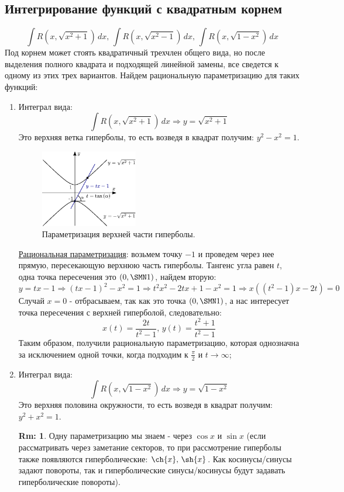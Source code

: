 \documentclass[12pt]{article}
\newcommand{\dd}{\, d}
\theoremstyle{definition}
\newtheorem{rem}{Rm:}
\DeclareMathOperator{\dint}{\displaystyle\int}
\begin{document}
\subsection*{Интегрирование функций с квадратным корнем}
$$
	\dint R(x, \sqrt{x^2 + 1}) \dd x, \, \dint R(x, \sqrt{x^2 - 1}) \dd x, \, \dint R(x, \sqrt{1 - x^2}) \dd x
$$ 
Под корнем может стоять квадратичный трехчлен общего вида, но после выделения полного квадрата и подходящей линейной замены, все сведется к одному из этих трех вариантов. Найдем рациональную параметризацию для таких функций:
\begin{enumerate}[label={(\Roman*)}]
	\item Интеграл вида: 
	$$
		\dint R(x, \sqrt{x^2 + 1}) \dd x \Rightarrow y = \sqrt{x^2 + 1}
	$$
	Это верхняя ветка гиперболы, то есть возведя в квадрат получим: $y^2 - x^2 = 1$.
	\begin{figure}[H]
		\centering
		\includegraphics[width=0.4\textwidth]{2_1.eps}
		\caption{Параметризация верхней части гиперболы.}
		\label{2_1}
	\end{figure}
	\uline{Рациональная параметризация}: возьмем точку $-1$ и проведем через нее прямую, пересекающую верхнюю часть гиперболы. Тангенс угла равен $t$, одна точка пересечения это $(0,\SMN 1)$, найдем вторую: 
	$$
		y = tx - 1 \Rightarrow (tx - 1)^2 - x^2 = 1 \Rightarrow t^2 x^2 - 2tx + 1 - x^2 = 1 \Rightarrow x((t^2 - 1)x - 2t) = 0
	$$
	Случай $x = 0$ - отбрасываем, так как это точка $(0,\SMN 1)$, а нас интересует точка пересечения с верхней гиперболой, следовательно:
	$$
		x(t) = \dfrac{2t}{t^2 - 1},\, y(t) = \dfrac{t^2 + 1}{t^2 - 1}
	$$ 
	Таким образом, получили рациональную параметризацию, которая однозначна за исключением одной точки, когда подходим к $\frac{\pi}{2}$ и $t \to \infty$;
	\item Интеграл вида: 
	$$
		\dint R(x, \sqrt{1 - x^2}) \dd x \Rightarrow y = \sqrt{1 - x^2}
	$$ 
	Это верхняя половина окружности, то есть возведя в квадрат получим: $y^2 + x^2 = 1$.
	\begin{rem}
		Одну параметризацию мы знаем - через $\cos{x}$ и $\sin{x}$ (если рассматривать через заметание секторов, то при рассмотрение гиперболы также появляются гиперболические: $\ch{x}, \, \sh{x}$. Как косинусы/синусы задают повороты, так и гиперболические синусы/косинусы будут задавать гиперболические повороты).

\end{rem}
\end{enumerate}
\end{document}
